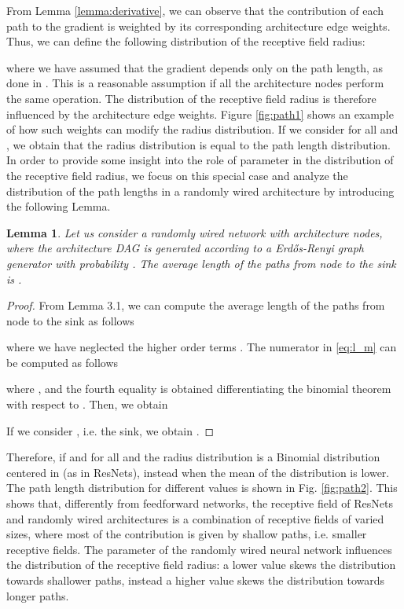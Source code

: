 \documentclass[10pt,twocolumn,twoside]{IEEEtran}
\newtheorem{lemma}[theorem]{Lemma}
\begin{document}
From Lemma \ref{lemma:derivative}, we can observe that the contribution of each path to the gradient is weighted by its corresponding architecture edge weights.
Thus, we can define the following distribution   of the receptive field radius:

where we have assumed that the gradient  depends only on the path length, as done in \cite{veit2016residual}. This is a reasonable assumption if all the architecture nodes perform the same operation. The distribution of the receptive field radius is therefore influenced by the architecture edge weights. Figure \ref{fig:path1} shows an example of how such weights can modify the radius distribution. If we consider  for all  and , we obtain that the radius distribution is equal to the path length distribution. In order to provide some insight into the role of parameter  in the distribution of the receptive field radius, we focus on this special case and analyze the distribution of the path lengths in a randomly wired architecture by introducing the following Lemma.

\begin{lemma}
Let us consider a randomly wired network with  architecture nodes, where the architecture DAG is generated according to a Erd\H{o}s-Renyi graph generator with probability . The average length of the paths from node  to the sink is .
\label{lemma:avg_length}
\end{lemma}
\begin{proof}
From Lemma 3.1, we can compute the average length of the paths from node  to the sink as follows

where we have neglected the higher order terms \cite{elandt1980survival}. The numerator in \eqref{eq:l_m} can be computed as follows

where ,  and the fourth equality is obtained differentiating the binomial theorem with respect to  .
Then, we obtain 

If we consider , i.e. the sink, we obtain .
\end{proof}

Therefore, if  and  for all  and  the radius distribution is a Binomial distribution centered in  (as in ResNets), instead when  the mean of the distribution is lower.  The path length distribution for different  values is shown in Fig. \ref{fig:path2}. This shows that, differently from feedforward networks, the receptive field of ResNets and randomly wired architectures is a combination of receptive fields of varied sizes, where most of the contribution is given by shallow paths, i.e. smaller receptive fields. The parameter  of the randomly wired neural network influences the distribution of the receptive field radius: a lower  value skews the distribution towards shallower paths, instead a higher  value skews the distribution towards longer paths. 
\end{document}
